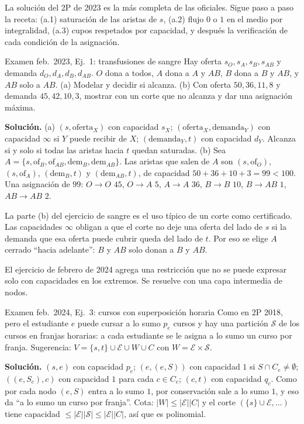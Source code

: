 La solución del 2P de 2023 es la más completa de las oficiales. Sigue paso a paso la receta: (a.1) saturación de las aristas de $s$, (a.2) flujo $0$ o $1$ en el medio por integralidad, (a.3) cupos respetados por capacidad, y después la verificación de cada condición de la asignación.

\begin{problema}{Examen feb.~2023, Ej.~1: transfusiones de sangre}
Hay oferta $s_O,s_A,s_B,s_{AB}$ y demanda $d_O,d_A,d_B,d_{AB}$. $O$ dona a todos, $A$ dona a $A$ y $AB$, $B$ dona a $B$ y $AB$, y $AB$ solo a $AB$. (a) Modelar y decidir si alcanza. (b) Con oferta $50,36,11,8$ y demanda $45,42,10,3$, mostrar con un corte que no alcanza y dar una asignación máxima.

\smallskip
\textbf{Solución.} (a) $(s,\text{oferta}_X)$ con capacidad $s_X$; $(\text{oferta}_X,\text{demanda}_Y)$ con capacidad $\infty$ si $Y$ puede recibir de $X$; $(\text{demanda}_Y,t)$ con capacidad $d_Y$. Alcanza si y solo si todas las aristas hacia $t$ quedan saturadas. (b) Sea $A=\{s,\text{of}_B,\text{of}_{AB},\text{dem}_B,\text{dem}_{AB}\}$. Las aristas que salen de $A$ son $(s,\text{of}_O)$, $(s,\text{of}_A)$, $(\text{dem}_B,t)$ y $(\text{dem}_{AB},t)$, de capacidad $50+36+10+3=99<100$. Una asignación de $99$: $O\to O$ $45$, $O\to A$ $5$, $A\to A$ $36$, $B\to B$ $10$, $B\to AB$ $1$, $AB\to AB$ $2$.
\end{problema}

La parte (b) del ejercicio de sangre es el uso típico de un corte como certificado. Las capacidades $\infty$ obligan a que el corte no deje una oferta del lado de $s$ si la demanda que esa oferta puede cubrir queda del lado de $t$. Por eso se elige $A$ cerrado ``hacia adelante'': $B$ y $AB$ solo donan a $B$ y $AB$.

El ejercicio de febrero de 2024 agrega una restricción que no se puede expresar solo con capacidades en los extremos. Se resuelve con una capa intermedia de nodos.

\begin{problema}{Examen feb.~2024, Ej.~3: cursos con superposición horaria}
Como en 2P 2018, pero el estudiante $e$ puede cursar a lo sumo $p_e$ cursos y hay una partición $\mathcal S$ de los cursos en franjas horarias: a cada estudiante se le asigna a lo sumo un curso por franja. Sugerencia: $V=\{s,t\}\cup\mathcal E\cup W\cup C$ con $W=\mathcal E\times\mathcal S$.

\smallskip
\textbf{Solución.} $(s,e)$ con capacidad $p_e$; $(e,(e,S))$ con capacidad $1$ si $S\cap C_e\ne\emptyset$; $((e,S_c),c)$ con capacidad $1$ para cada $c\in C_e$; $(c,t)$ con capacidad $q_c$. Como por cada nodo $(e,S)$ entra a lo sumo $1$, por conservación sale a lo sumo $1$, y eso da ``a lo sumo un curso por franja''. Cota: $|W|\le|\mathcal E||C|$ y el corte $(\{s\}\cup\mathcal E,\dots)$ tiene capacidad $\le|\mathcal E||\mathcal S|\le|\mathcal E||C|$, así que es polinomial.
\end{problema}

